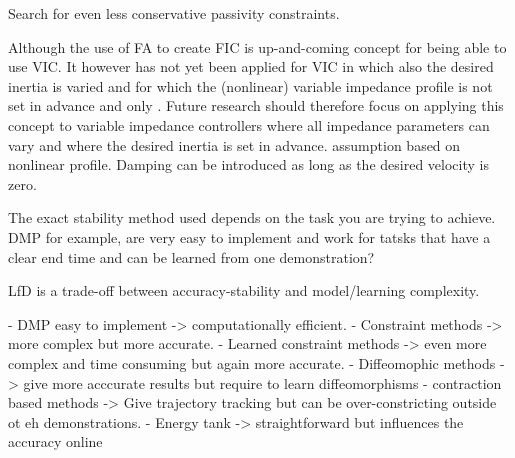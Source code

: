 Search for even less conservative passivity constraints.

Although the use of FA to create FIC is up-and-coming concept for being able to use VIC. It however has not yet been applied for VIC in which also the desired inertia is varied and for which the (nonlinear) variable impedance profile is not set in advance and only . Future research should therefore focus on applying this concept to variable impedance controllers where all impedance parameters can vary and where the desired inertia is set in advance. assumption based on nonlinear profile.
Damping can be introduced as long as the desired velocity is zero.

The exact stability method used depends on the task you are trying to achieve. DMP for example, are very easy to implement and work for tatsks that have a clear end time and can be learned from one demonstration?

LfD is a trade-off between accuracy-stability and model/learning complexity.

- DMP easy to implement -> computationally efficient.
- Constraint methods -> more complex but more accurate.
- Learned constraint methods -> even more complex and time consuming but again more accurate.
- Diffeomophic methods -> give more acccurate results but require to learn diffeomorphisms
- contraction based methods -> Give trajectory tracking but can be over-constricting outside ot eh demonstrations.
- Energy tank -> straightforward but influences the accuracy online
